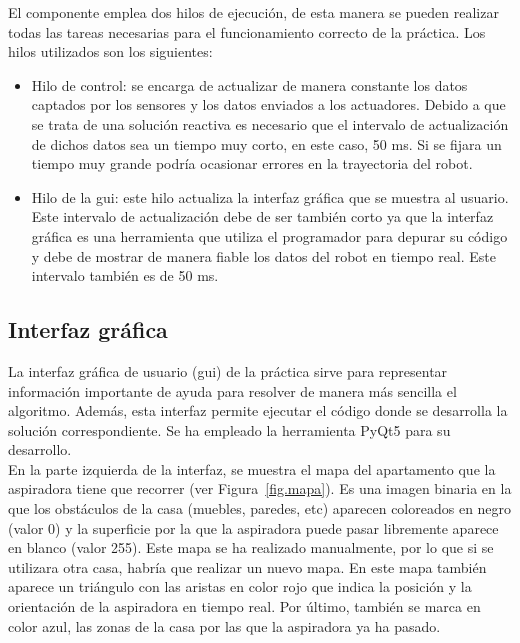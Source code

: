 El componente emplea dos hilos de ejecución, de esta manera se pueden realizar todas las tareas necesarias para el funcionamiento correcto de la práctica. Los hilos utilizados son los siguientes:

\begin{itemize}
\item	Hilo de control: se encarga de actualizar de manera constante los datos captados por los sensores y los datos enviados a los actuadores. Debido a que se trata de una solución reactiva es necesario que el intervalo de actualización de dichos datos sea un tiempo muy corto, en este caso, 50 ms. Si se fijara un tiempo muy grande podría ocasionar errores en la trayectoria del robot.
\item	Hilo de la \acrshort{gui}: este hilo actualiza la interfaz gráfica que se muestra al usuario. Este intervalo de actualización debe de ser también corto ya que la interfaz gráfica es una herramienta que utiliza el programador para depurar su código y debe de mostrar de manera fiable los datos del robot en tiempo real. Este intervalo también es de 50 ms.
\end{itemize}

\subsection{Interfaz gráfica}
La interfaz gráfica de usuario (\acrshort{gui}) de la práctica sirve para representar información importante de ayuda para resolver de manera más sencilla el algoritmo. Además, esta interfaz permite ejecutar el código donde se desarrolla la solución correspondiente. Se ha empleado la herramienta PyQt5 para su desarrollo.\\

En la parte izquierda de la interfaz, se muestra el mapa del apartamento que la aspiradora tiene que recorrer (ver Figura~\ref{fig.mapa}). Es una imagen binaria en la que los obstáculos de la casa (muebles, paredes, etc) aparecen coloreados en negro (valor 0) y la superficie por la que la aspiradora puede pasar libremente aparece en blanco (valor 255). Este mapa se ha realizado manualmente, por lo que si se utilizara otra casa, habría que realizar un nuevo mapa. En este mapa también aparece un triángulo con las aristas en color rojo que indica la posición y la orientación de la aspiradora en tiempo real. Por último, también se marca en color azul, las zonas de la casa por las que la aspiradora ya ha pasado.

